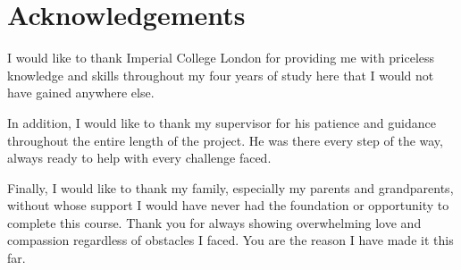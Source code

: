 \section*{Acknowledgements}
I would like to thank Imperial College London for providing me with priceless knowledge and skills throughout my four years of study here that I would not have gained anywhere else.

In addition, I would like to thank my supervisor for his patience and guidance throughout the entire length of the project. He was there every step of the way, always ready to help with every challenge faced.

Finally, I would like to thank my family, especially my parents and grandparents, without whose support I would have never had the foundation or opportunity to complete this course. Thank you for always showing overwhelming love and compassion regardless of obstacles I faced. You are the reason I have made it this far.

\clearpage